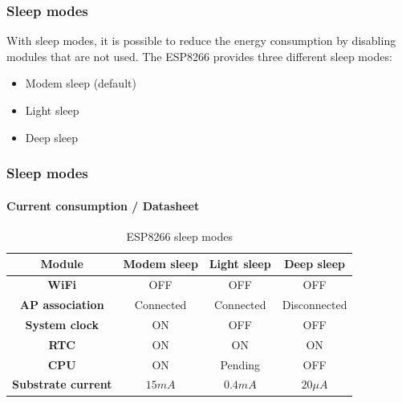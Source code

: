 

\begin{frame}
    \frametitle{Sleep modes}
    With sleep modes, it is possible to reduce the energy consumption by disabling modules that are not used.
    The ESP8266 provides three different sleep modes:
    \begin{itemize}
        \item Modem sleep (default)
        \item Light sleep
        \item Deep sleep
    \end{itemize}
\end{frame}

\begin{frame}
    \frametitle{Sleep modes}
    \framesubtitle{Current consumption / Datasheet}

    \begin{table}[htbp]
        \caption{ESP8266 sleep modes}
        \begin{center}
        \begin{tabular}{|c|c|c|c|}
        \hline
        \textbf{Module}&\textbf{Modem sleep}&\textbf{Light sleep}&\textbf{Deep sleep}\\
        \hline
        \textbf{WiFi} & OFF & OFF & OFF\\
        \textbf{AP association} & Connected & Connected & Disconnected\\
        \textbf{System clock} & ON & OFF & OFF\\
        \textbf{RTC} & ON & ON & ON\\
        \textbf{CPU} & ON & Pending & OFF\\
        \hline
        \textbf{Substrate current} & $15mA$ & $0.4mA$ & $20\mu A$\\
        \hline
        \end{tabular}
        \label{tab_sleep_modes}
        \end{center}
    \end{table}
\end{frame}

